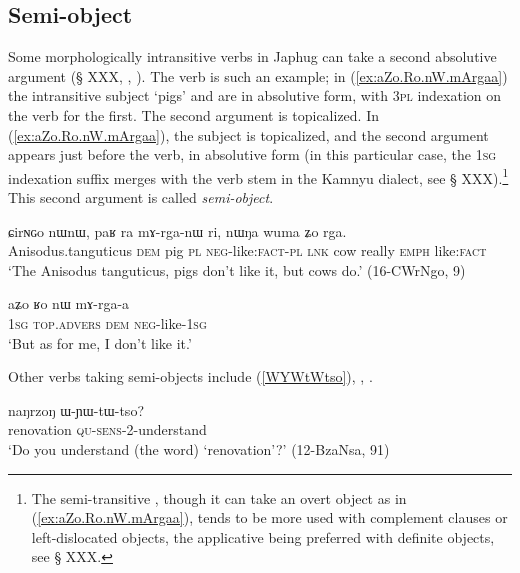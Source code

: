 \subsection{Semi-object} \label{sec:semi.object}
Some morphologically intransitive verbs in Japhug can take a second absolutive argument (§ XXX, \citealt[4-5]{jacques16relatives},  \citealt[224]{jacques16complementation}). The verb  is such an example; in (\ref{ex:aZo.Ro.nW.mArgaa}) the intransitive subject  `pigs' and  are in absolutive form, with  \textsc{3pl} indexation on the verb for the first. The second argument   is topicalized. In (\ref{ex:aZo.Ro.nW.mArgaa}), the subject is topicalized, and the second argument   appears just before the verb, in absolutive form (in this particular case, the \textsc{1sg} indexation suffix merges with the verb stem in the Kamnyu dialect, see § XXX).\footnote{The semi-transitive , though it can take an overt object as in  (\ref{ex:aZo.Ro.nW.mArgaa}), tends to be more used with complement clauses or left-dislocated objects, the applicative  being preferred with definite objects, see § XXX.} This second argument is called \textit{semi-object}.

\begin{exe}
\ex \label{ex:paR.ra.mArganW}
\gll ɕirɴɢo nɯnɯ, paʁ ra mɤ-rga-nɯ ri, nɯŋa wuma ʑo rga.\\
Anisodus.tanguticus \textsc{dem} pig \textsc{pl} \textsc{neg}-like:\textsc{fact}-\textsc{pl} \textsc{lnk} cow really \textsc{emph} like:\textsc{fact} \\
\glt `The Anisodus tanguticus, pigs don't like it, but cows do.' (16-CWrNgo, 9)
\end{exe}

\begin{exe}
\ex \label{ex:aZo.Ro.nW.mArgaa}
\gll aʑo ʁo nɯ mɤ-rga-a \\
\textsc{1sg}  \textsc{top}.\textsc{advers} \textsc{dem} \textsc{neg}-like-\textsc{1sg} \\
\glt `But as for me, I don't like it.' 
\end{exe}

Other verbs taking semi-objects include  (\ref{WYWtWtso}), , .

\begin{exe}
\ex \label{WYWtWtso}
 \gll naŋrzoŋ ɯ-ɲɯ-tɯ-tso? \\
renovation \textsc{qu}-\textsc{sens}-2-understand \\
\glt `Do you understand (the word) `renovation'?' (12-BzaNsa, 91)
\end{exe}

